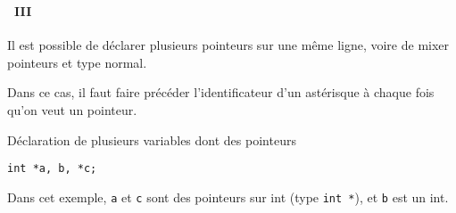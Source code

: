 \begin{frame}[containsverbatim]
  \frametitle{\secname}
  \framesubtitle{\subsecname~III}
  
  Il est possible de déclarer plusieurs pointeurs sur une même ligne, voire de mixer pointeurs et type normal.
  \vspace{0.5cm}
  \par
  Dans ce cas, il faut faire précéder l'identificateur d'un astérisque à chaque fois qu'on veut un pointeur.
  \begin{exampleblock}{Déclaration de plusieurs variables dont des pointeurs}
    \begin{verbatim}
int *a, b, *c;\end{verbatim}
  \end{exampleblock}
  \par
  Dans cet exemple, \texttt{a} et \texttt{c} sont des pointeurs sur int (type \texttt{int *}), et \texttt{b} est un int.
\end{frame}


